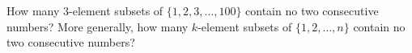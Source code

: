 How many $3$-element subsets of $\{1,2,3,\dots,100\}$ contain no two consecutive numbers? More generally, how many $k$-element subsets of $\{1,2,\dots,n\}$ contain no two consecutive numbers?

